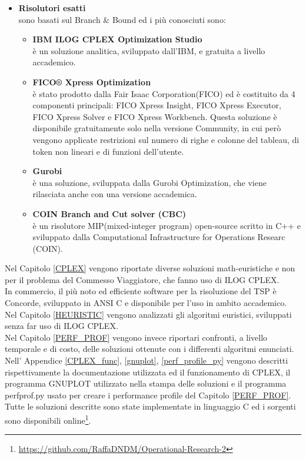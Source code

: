 \begin{itemize}
\item{\textbf{Risolutori esatti}\\ sono basati sul Branch \& Bound ed i più conosciuti sono:
\begin{itemize}
\item{\textbf{IBM ILOG CPLEX Optimization Studio}\\
è un soluzione analitica, sviluppato dall'IBM, e gratuita a livello accademico.}
\item{\textbf{FICO® Xpress Optimization}\\
è stato prodotto dalla Fair Isaac Corporation(FICO) ed è costituito da 4 componenti principali: FICO Xpress Insight, FICO Xpress Executor, FICO Xpress Solver e FICO Xpress Workbench. Questa soluzione è disponibile gratuitamente solo nella versione Community, in cui però vengono applicate restrizioni sul numero di righe e colonne del tableau, di token non lineari e di funzioni dell'utente.}
\item{\textbf{Gurobi}\\
è una soluzione, sviluppata dalla Gurobi Optimization, che viene rilasciata anche con una versione accademica.}
\item{\textbf{COIN Branch and Cut solver (CBC)}\\
è un risolutore MIP(mixed-integer program) open-source scritto in C++ e sviluppato dalla Computational Infrastructure for Operations Researc (COIN).}
\end{itemize}
}
\end{itemize}
Nel Capitolo \ref{CPLEX} vengono riportate diverse soluzioni math-euristiche e non per il problema del Commesso Viaggiatore, che fanno uso di ILOG CPLEX.\\
In commercio, il più noto ed efficiente software per la risoluzione del TSP è Concorde, sviluppato in ANSI C e disponibile per l'uso in ambito accademico\cite{concorde}.\\
Nel Capitolo \ref{HEURISTIC} vengono analizzati gli algoritmi euristici, sviluppati senza far uso di ILOG CPLEX.\\
Nel Capitolo \ref{PERF_PROF} vengono invece riportari confronti, a livello temporale e di costo, delle soluzioni ottenute con i differenti algoritmi enunciati.\\
Nell' Appendice \ref{CPLEX_func}, \ref{gnuplot}, \ref{perf_profile_py} vengono descritti rispettivamente la documentazione utilizzata ed il funzionamento di CPLEX, il programma GNUPLOT utilizzato nella stampa delle soluzioni e il programma perfprof.py usato per creare i performance profile del Capitolo \ref{PERF_PROF}.\\
Tutte le soluzioni descritte sono state implementate in linguaggio C ed i sorgenti sono disponibili online\footnote{\url{https://github.com/RaffaDNDM/Operational-Research-2}}.